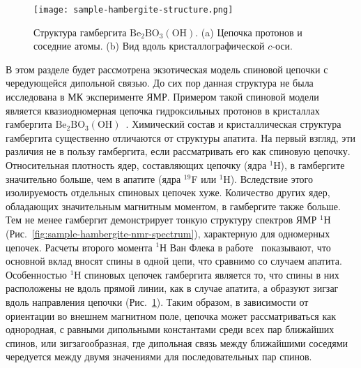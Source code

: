 \begin{figure}
  \centering
  \texttt{[image: sample-hambergite-structure.png]}
  \caption{
    Структура гамбергита $\mathrm{Be}_2\mathrm{BO}_3(\mathrm{OH})$.
    (a) Цепочка протонов и соседние атомы.
    (b) Вид вдоль кристаллографической $c$-оси.
  }
  \label{fig:sample-hambergite-structure}
\end{figure}
В этом разделе будет рассмотрена экзотическая модель спиновой цепочки с чередующейся дипольной связью.
До сих пор данная структура не была исследована в МК эксперименте ЯМР.
Примером такой спиновой модели является квазиодномерная цепочка гидроксильных протонов в кристаллах гамбергита $\mathrm{Be}_2\mathrm{BO}_3(\mathrm{OH})$~\cite{Zachariasen1931, Gatta2012}.
Химический состав и кристаллическая структура гамбергита существенно отличаются от структуры апатита.
На первый взгляд, эти различия не в пользу гамбергита,
если рассматривать его как спиновую цепочку.
Относительная плотность ядер, составляющих цепочку (ядра $^1$Н),
в гамбергите значительно больше, чем в апатите (ядра $^{19}$F или $^1$Н).
Вследствие этого изолируемость отдельных спиновых цепочек хуже.
Количество других ядер,
обладающих значительным магнитным   моментом,
в гамбергите также больше.
Тем не менее гамбергит демонстрирует тонкую структуру спектров ЯМР $^1$Н (Рис.~\ref{fig:sample-hambergite-nmr-spectrum}),
характерную для одномерных цепочек.
Расчеты второго момента $^1$Н Ван Флека в работе~\cite{Bochkin2020jmr} показывают,
что основной вклад вносят спины в одной цепи,
что сравнимо со случаем апатита.
Особенностью $^1$Н спиновых цепочек гамбергита является то,
что спины в них расположены не вдоль прямой линии,
как в случае апатита,
а образуют зигзаг вдоль направления цепочки (Рис.~\ref{fig:sample-hambergite-structure}).
Таким образом, в зависимости от ориентации во внешнем магнитном поле,
цепочка может рассматриваться как однородная,
с равными дипольными константами среди всех пар ближайших спинов,
или зигзагообразная,
где дипольная связь между ближайшими соседями чередуется между двумя значениями для последовательных пар спинов.


